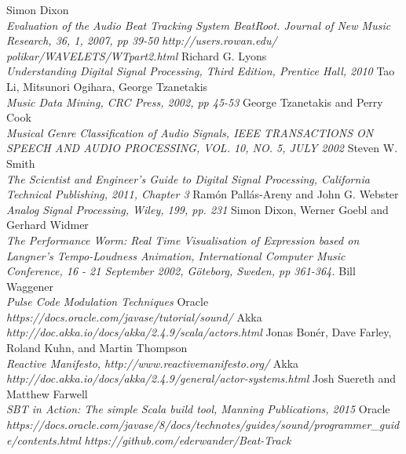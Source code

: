 \documentclass[a4paper, 11pt]{article}
\begin{document}
\begin{thebibliography}{99}
Simon Dixon\\
\textit{Evaluation of the Audio Beat Tracking System BeatRoot. Journal of New Music Research, 36, 1, 2007, pp 39-50}
\textit{http://users.rowan.edu/ polikar/WAVELETS/WTpart2.html}
Richard G. Lyons\\
\textit{Understanding Digital Signal Processing, Third Edition, Prentice Hall, 2010}
Tao Li, Mitsunori Ogihara, George Tzanetakis\\
\textit{Music Data Mining, CRC Press, 2002, pp 45-53}
George Tzanetakis and Perry Cook\\
\textit{Musical Genre Classification of Audio Signals, IEEE TRANSACTIONS ON SPEECH AND AUDIO PROCESSING, VOL. 10, NO. 5, JULY 2002}
Steven W. Smith\\
\textit{The Scientist and Engineer's Guide to Digital Signal Processing, California Technical Publishing, 2011, Chapter 3}
Ramón Pallás-Areny and John G. Webster\\
\textit{Analog Signal Processing, Wiley, 199, pp. 231}
Simon Dixon, Werner Goebl and Gerhard Widmer\\
\textit{The Performance Worm: Real Time Visualisation of Expression based on Langner’s Tempo-Loudness Animation, International Computer Music Conference, 16 - 21 September 2002, Göteborg, Sweden, pp 361-364.}
Bill Waggener\\
\textit{Pulse Code Modulation Techniques}
Oracle\\
\textit{https://docs.oracle.com/javase/tutorial/sound/}
Akka\\
\textit{http://doc.akka.io/docs/akka/2.4.9/scala/actors.html}
Jonas Bonér, Dave Farley, Roland Kuhn, and Martin Thompson\\
\textit{Reactive Manifesto, http://www.reactivemanifesto.org/}
Akka\\
\textit{http://doc.akka.io/docs/akka/2.4.9/general/actor-systems.html}
Josh Suereth and Matthew Farwell\\
\textit{SBT in Action: The simple Scala build tool, Manning Publications, 2015}
Oracle\\
\textit{https://docs.oracle.com/javase/8/docs/technotes/guides/sound/programmer\_guide/contents.html}
\textit{https://github.com/ederwander/Beat-Track}

\end{thebibliography}
\end{document}
